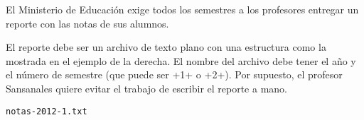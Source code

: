 El Ministerio de Educación exige todos los semestres a los profesores
entregar un reporte con las notas de sus alumnos.

\begin{minipage}[t]{.58\textwidth}
  El reporte debe ser un archivo de texto plano
  con una estructura como la mostrada
  en el ejemplo de la derecha.
  El nombre del archivo debe tener el año y el número de semestre
  (que puede ser \li+1+ o \li+2+).
  Por supuesto,
  el profesor Sansanales quiere evitar el trabajo
  de escribir el reporte a mano.
\end{minipage}
\hfill
\begin{minipage}[t]{.38\textwidth}
  \centering
  \verb+notas-2012-1.txt+
  
\end{minipage}

